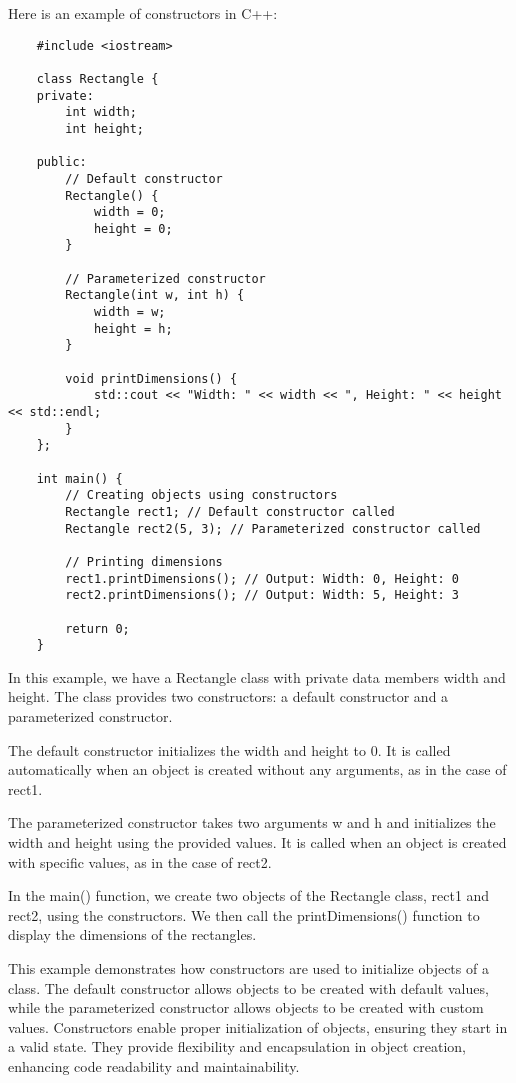 \begin{solution}
    Here is an example of constructors in C++: \\
    \horizontalline
    \begin{verbatim}
    #include <iostream>

    class Rectangle {
    private:
        int width;
        int height;
    
    public:
        // Default constructor
        Rectangle() {
            width = 0;
            height = 0;
        }
    
        // Parameterized constructor
        Rectangle(int w, int h) {
            width = w;
            height = h;
        }
    
        void printDimensions() {
            std::cout << "Width: " << width << ", Height: " << height << std::endl;
        }
    };
    
    int main() {
        // Creating objects using constructors
        Rectangle rect1; // Default constructor called
        Rectangle rect2(5, 3); // Parameterized constructor called
    
        // Printing dimensions
        rect1.printDimensions(); // Output: Width: 0, Height: 0
        rect2.printDimensions(); // Output: Width: 5, Height: 3
    
        return 0;
    }        
    \end{verbatim}
    
    \horizontalline

    In this example, we have a Rectangle class with private data members width and height. The class provides two constructors: a default constructor and a parameterized constructor.

    \noindent The default constructor initializes the width and height to 0. It is called automatically when an object is created without any arguments, as in the case of rect1.

    \noindent The parameterized constructor takes two arguments w and h and initializes the width and height using the provided values. It is called when an object is created with specific values, 
    as in the case of rect2.

    \noindent In the main() function, we create two objects of the Rectangle class, rect1 and rect2, using the constructors. We then call the printDimensions() function to display the dimensions 
    of the rectangles.

    \noindent This example demonstrates how constructors are used to initialize objects of a class. The default constructor allows objects to be created with default values, while the parameterized constructor 
    allows objects to be created with custom values. Constructors enable proper initialization of objects, ensuring they start in a valid state. They provide flexibility and encapsulation in object 
    creation, enhancing code readability and maintainability.
\end{solution}

